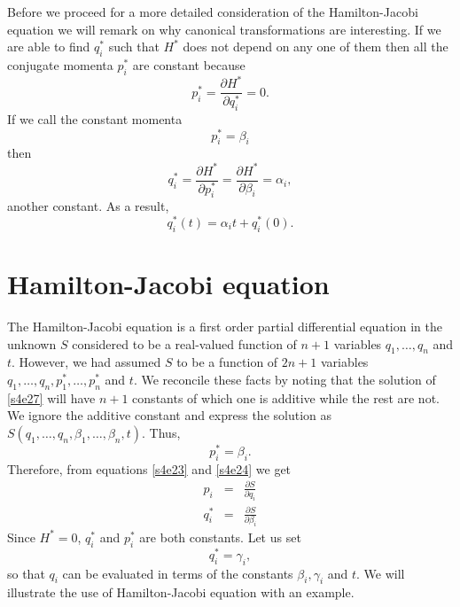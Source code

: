 \documentclass{article}
\newcommand{\pd}[2]{\frac{\partial{#1}}{\partial{#2}}}
\numberwithin{equation}{section}
\theoremstyle{plain}
\numberwithin{thm}{section}
\theoremstyle{plain}
\numberwithin{prop}{section}
\theoremstyle{definition}
\numberwithin{defn}{section}
\theoremstyle{remark}
\begin{document}
Before we proceed for a more detailed consideration of the Hamilton-Jacobi
equation we will remark on why canonical transformations are interesting. If
we are able to find $q_i^\ast$ such that $H^\ast$ does not depend on any one
of them then all the conjugate momenta $p_i^\ast$ are constant because
\begin{equation}\label{s4e28}
p_i^\ast = \pd{H^\ast}{q_i^\ast} = 0.
\end{equation}
If we call the constant momenta
\begin{equation}\label{s4e29}
p_i^\ast = \beta_i
\end{equation}
then
\begin{equation}\label{s4e30}
q_i^\ast = \pd{H^\ast}{p_i^\ast} = \pd{H^\ast}{\beta_i} = \alpha_i,
\end{equation}
another constant. As a result,
\begin{equation}\label{s4e31}
q_i^\ast(t) = \alpha_i t + q_i^\ast(0).
\end{equation}

\section{Hamilton-Jacobi equation}\label{s5}
The Hamilton-Jacobi equation is a first order partial differential equation
in the unknown $S$ considered to be a real-valued function of $n+1$ variables
$q_1, \ldots, q_n$ and $t$. However, we had assumed $S$ to be a function of
$2n + 1$ variables $q_1, \ldots, q_n, p_1^\ast, \ldots, p_n^\ast$ and $t$.
We reconcile these facts by noting that the solution of \eqref{s4e27} will
have $n + 1$ constants of which one is additive while the rest are not. We
ignore the additive constant and express the solution as $S(q_1, \ldots, q_n,
\beta_1, \ldots, \beta_n, t)$. Thus,
\begin{equation}\label{s5e1}
p_i^\ast = \beta_i.
\end{equation}
Therefore, from equations \eqref{s4e23} and \eqref{s4e24} we get
\begin{eqnarray}
p_i &=& \pd{S}{q_i} \label{s5e2} \\
q_i^\ast &=& \pd{S}{\beta_i} \label{s5e3}
\end{eqnarray}
Since $H^\ast = 0$, $q_i^\ast$ and $p_i^\ast$ are both constants. Let us set
\begin{equation}\label{s5e4}
q_i^\ast = \gamma_i,
\end{equation}
so that $q_i$ can be evaluated in terms of the constants $\beta_i, \gamma_i$ 
and $t$. We will illustrate the use of Hamilton-Jacobi equation with an example.
\end{document}
